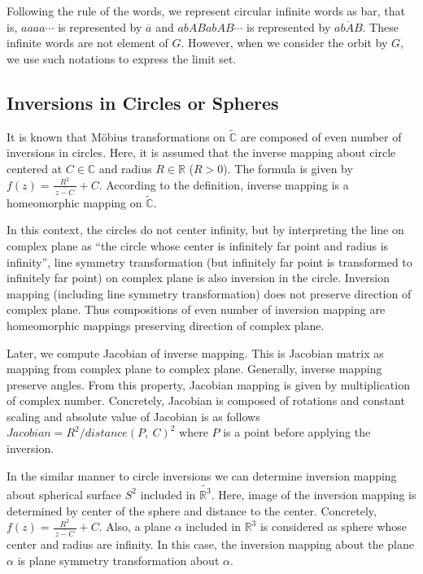 Following the rule of the words, we represent circular infinite words as
bar, that is, $aaaa\cdots$ is represented by $\overline{a}$ and $abABabAB \cdots$ 
is represented by $\overline{abAB}$.
These infinite words are not element of $G$. However, when we consider
the orbit by $G$, we use such notations to express the limit set.

\subsection{Inversions in Circles or Spheres}

It is known that M\"obius transformations on $\tilde{\mathbb{C}}$
are composed of even number of inversions in circles.
Here, it is assumed that the inverse mapping about circle centered at
$C\in\mathbb{C}$ and radius $R\in\mathbb{R}$ ($R>0$).
The formula is given by
$f(z) = \frac{R^2}{~\overline{z -C}~} + C$.
According to the definition, inverse mapping is a homeomorphic mapping on
$\tilde{\mathbb{C}}$.

In this context, the circles do not center infinity, but 
by interpreting the line on complex plane as ``the circle whose center is
infinitely far point and radius is infinity'', 
line symmetry transformation (but infinitely far point is
transformed to infinitely far point) on complex plane 
is also inversion in the circle.
Inversion mapping (including line symmetry transformation) does not
preserve direction of complex plane.
Thus compositions of even number of inversion mapping are homeomorphic
mappings preserving direction of complex plane.

Later, we compute Jacobian of inverse mapping.
This is Jacobian matrix as mapping from complex plane to complex plane.
Generally, inverse mapping preserve angles.
From this property, Jacobian mapping is given by multiplication of complex
number.
Concretely, Jacobian is composed of rotations and constant scaling
and absolute value of Jacobian is as follows
$Jacobian = R^2 / distance(P,~C)^2$
where $P$ is a point before applying the inversion.

In the similar manner to circle inversions we can determine inversion
mapping about spherical surface $S^2$ included in $\tilde{\mathbb{R}^3}$.
Here, image of the inversion mapping is determined by center of the sphere and
distance to the center.
Concretely, $f(z) = \frac{R^2}{~\overline{z -C}~} + C$.
Also, a plane $\alpha$ included in $\mathbb{R}^3$ is considered as
sphere whose center and radius are infinity.
In this case, the inversion mapping about the plane $\alpha$ is plane symmetry
transformation about $\alpha$.

